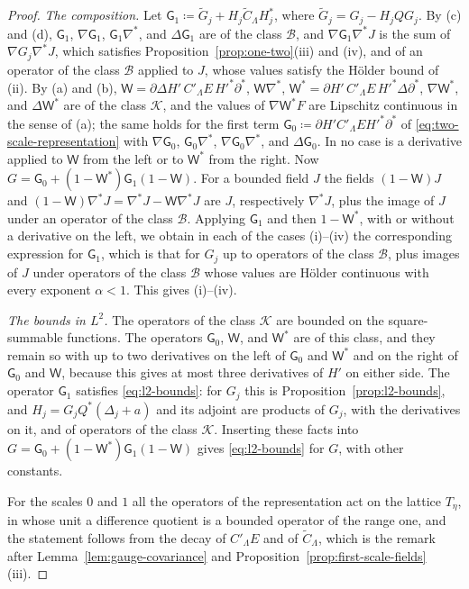 \documentclass[11pt]{preprint}
\numberwithin{equation}{section}
\theoremstyle{definition}
\theoremstyle{remark}
\theoremstyle{plain}
\begin{document}
\begin{proof}
\emph{The composition.} Let $\mathsf G_1 \coloneqq \tilde G_j + H_j\tilde C_\Lambda H_j^*$, where $\tilde G_j = G_j - H_jQG_j$. By (c) and (d), $\mathsf G_1$, $\nabla\mathsf G_1$, $\mathsf G_1\nabla^*$, and $\Delta\mathsf G_1$ are of the class $\mathcal B$, and $\nabla\mathsf G_1\nabla^*J$ is the sum of $\nabla G_j\nabla^*J$, which satisfies Proposition~\ref{prop:one-two}(iii) and (iv), and of an operator of the class $\mathcal B$ applied to $J$, whose values satisfy the H\"older bound of (ii). By (a) and (b), $\mathsf W = \partial\Delta H'\,C'_\Lambda E\,H'^*\partial^*$, $\mathsf W\nabla^*$, $\mathsf W^* = \partial H'\,C'_\Lambda E\,H'^*\Delta\partial^*$, $\nabla\mathsf W^*$, and $\Delta\mathsf W^*$ are of the class $\mathcal K$, and the values of $\nabla\mathsf W^*F$ are Lipschitz continuous in the sense of (a); the same holds for the first term $\mathsf G_0 \coloneqq \partial H'C'_\Lambda EH'^*\partial^*$ of \eqref{eq:two-scale-representation} with $\nabla\mathsf G_0$, $\mathsf G_0\nabla^*$, $\nabla\mathsf G_0\nabla^*$, and $\Delta\mathsf G_0$. In no case is a derivative applied to $\mathsf W$ from the left or to $\mathsf W^*$ from the right. Now $G = \mathsf G_0 + (1 - \mathsf W^*)\mathsf G_1(1 - \mathsf W)$. For a bounded field $J$ the fields $(1 - \mathsf W)J$ and $(1 - \mathsf W)\nabla^*J = \nabla^*J - \mathsf W\nabla^*J$ are $J$, respectively $\nabla^*J$, plus the image of $J$ under an operator of the class $\mathcal B$. Applying $\mathsf G_1$ and then $1 - \mathsf W^*$, with or without a derivative on the left, we obtain in each of the cases (i)--(iv) the corresponding expression for $\mathsf G_1$, which is that for $G_j$ up to operators of the class $\mathcal B$, plus images of $J$ under operators of the class $\mathcal B$ whose values are H\"older continuous with every exponent $\alpha < 1$. This gives (i)--(iv).

\emph{The bounds in $L^2$.} The operators of the class $\mathcal K$ are bounded on the square-summable functions. The operators $\mathsf G_0$, $\mathsf W$, and $\mathsf W^*$ are of this class, and they remain so with up to two derivatives on the left of $\mathsf G_0$ and $\mathsf W^*$ and on the right of $\mathsf G_0$ and $\mathsf W$, because this gives at most three derivatives of $H'$ on either side. The operator $\mathsf G_1$ satisfies \eqref{eq:l2-bounds}: for $G_j$ this is Proposition~\ref{prop:l2-bounds}, and $H_j = G_jQ^*(\Delta_j + a)$ and its adjoint are products of $G_j$, with the derivatives on it, and of operators of the class $\mathcal K$. Inserting these facts into $G = \mathsf G_0 + (1 - \mathsf W^*)\mathsf G_1(1 - \mathsf W)$ gives \eqref{eq:l2-bounds} for $G$, with other constants.

For the scales $0$ and $1$ all the operators of the representation act on the lattice $T_\eta$, in whose unit a difference quotient is a bounded operator of the range one, and the statement follows from the decay of $C'_\Lambda E$ and of $\tilde C_\Lambda$, which is the remark after Lemma~\ref{lem:gauge-covariance} and Proposition~\ref{prop:first-scale-fields}(iii).
\end{proof}
\end{document}
